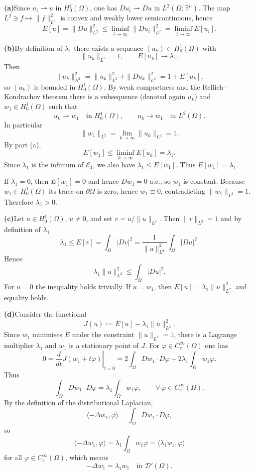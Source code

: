 \begin{solution}
\par\medskip\noindent\textbf{(a)}\quad  Since $u_i\rightharpoonup u$ in $H_0^1(\Omega)$, one has
$Du_i\rightharpoonup Du$ in $L^2(\Omega;\mathbb{R}^n)$. The map
$L^2\ni f\mapsto\|f\|_{L^2}^2$ is convex and weakly lower semicontinuous,
hence
\[
E[u]=\|Du\|_{L^2}^2\le
\liminf_{i\to\infty}\|Du_i\|_{L^2}^2
=\liminf_{i\to\infty}E[u_i].
\]

\par\medskip\noindent\textbf{(b)}\quad  By definition of $\lambda_1$ there exists a sequence
$(u_k)\subset H_0^1(\Omega)$ with
\[
\|u_k\|_{L^2}=1,\qquad E[u_k]\to\lambda_1.
\]
Then
\[
\|u_k\|_{H^1}^2=\|u_k\|_{L^2}^2+\|Du_k\|_{L^2}^2
=1+E[u_k],
\]
so $(u_k)$ is bounded in $H_0^1(\Omega)$. By weak compactness and the
Rellich--Kondrachov theorem there is a subsequence (denoted again $u_k$)
and $w_1\in H_0^1(\Omega)$ such that
\[
u_k\rightharpoonup w_1\quad\text{in }H_0^1(\Omega),\qquad
u_k\to w_1\quad\text{in }L^2(\Omega).
\]
In particular
\[
\|w_1\|_{L^2}=\lim_{k\to\infty}\|u_k\|_{L^2}=1.
\]
By part (a),
\[
E[w_1]\le\liminf_{k\to\infty}E[u_k]=\lambda_1.
\]
Since $\lambda_1$ is the infimum of $\mathcal{E}_1$, we also have
$\lambda_1\le E[w_1]$. Thus $E[w_1]=\lambda_1$.

If $\lambda_1=0$, then $E[w_1]=0$ and hence $Dw_1=0$ a.e., so $w_1$ is
constant. Because $w_1\in H_0^1(\Omega)$ its trace on $\partial\Omega$ is
zero, hence $w_1\equiv 0$, contradicting $\|w_1\|_{L^2}=1$. Therefore
$\lambda_1>0$.

\par\medskip\noindent\textbf{(c)}\quad  Let $u\in H_0^1(\Omega)$, $u\neq 0$, and set
$v=u/\|u\|_{L^2}$. Then $\|v\|_{L^2}=1$ and by definition of $\lambda_1$
\[
\lambda_1\le E[v]
=\int_\Omega|Dv|^2
=\frac{1}{\|u\|_{L^2}^2}\int_\Omega |Du|^2.
\]
Hence
\[
\lambda_1\|u\|_{L^2}^2\le\int_\Omega |Du|^2.
\]
For $u=0$ the inequality holds trivially. If $u=w_1$, then
$E[u]=\lambda_1\|u\|_{L^2}^2$ and equality holds.

\par\medskip\noindent\textbf{(d)}\quad  Consider the functional
\[
J(u):=E[u]-\lambda_1\|u\|_{L^2}^2.
\]
Since $w_1$ minimises $E$ under the constraint $\|u\|_{L^2}=1$, there is a
Lagrange multiplier $\lambda_1$ and $w_1$ is a stationary point of $J$.
For $\varphi\in C_c^\infty(\Omega)$ one has
\[
0 = \left.\frac{d}{dt}J(w_1+t\varphi)\right|_{t=0}
=2\int_\Omega Dw_1\cdot D\varphi
-2\lambda_1\int_\Omega w_1\varphi.
\]
Thus
\[
\int_\Omega Dw_1\cdot D\varphi
=\lambda_1\int_\Omega w_1\varphi,
\qquad\forall\,\varphi\in C_c^\infty(\Omega).
\]
By the definition of the distributional Laplacian,
\[
\langle -\Delta w_1,\varphi\rangle
=\int_\Omega Dw_1\cdot D\varphi,
\]
so
\[
\langle -\Delta w_1,\varphi\rangle
=\lambda_1\int_\Omega w_1\varphi
=\langle \lambda_1 w_1,\varphi\rangle
\]
for all $\varphi\in C_c^\infty(\Omega)$, which means
\[
-\Delta w_1=\lambda_1 w_1 \quad\text{in }\mathcal{D}'(\Omega).
\]


\end{solution}

